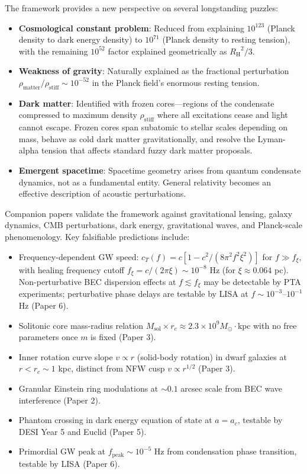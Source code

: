 \documentclass[11pt,a4paper]{article}
\newcommand{\rhostiff}{\ensuremath{\rho_{\mathrm{stiff}}}}
\newcommand{\RH}{\ensuremath{R_{\mathrm{H}}}}
\theoremstyle{definition}
\theoremstyle{remark}
\begin{document}
The framework provides a new perspective on several longstanding puzzles:

\begin{itemize}[leftmargin=*, itemsep=0.2em]
\item \textbf{Cosmological constant problem}: Reduced from explaining $10^{123}$ (Planck density to dark energy density) to $10^{71}$ (Planck density to resting tension), with the remaining $10^{52}$ factor explained geometrically as $\RH^2/3$.

\item \textbf{Weakness of gravity}: Naturally explained as the fractional perturbation $\rho_{\mathrm{matter}}/\rhostiff \sim 10^{-52}$ in the Planck field's enormous resting tension.

\item \textbf{Dark matter}: Identified with frozen cores---regions of the condensate compressed to maximum density $\rhostiff$ where all excitations cease and light cannot escape. Frozen cores span subatomic to stellar scales depending on mass, behave as cold dark matter gravitationally, and resolve the Lyman-alpha tension that affects standard fuzzy dark matter proposals.

\item \textbf{Emergent spacetime}: Spacetime geometry arises from quantum condensate dynamics, not as a fundamental entity. General relativity becomes an effective description of acoustic perturbations.
\end{itemize}

Companion papers validate the framework against gravitational lensing, galaxy dynamics, CMB perturbations, dark energy, gravitational waves, and Planck-scale phenomenology. Key falsifiable predictions include:

\begin{itemize}[leftmargin=*, itemsep=0.2em]
\item Frequency-dependent GW speed: $c_T(f) = c[1 - c^2/(8\pi^2 f^2 \xi^2)]$ for $f \gg f_\xi$, with healing frequency cutoff $f_\xi = c/(2\pi\xi) \sim 10^{-8}$ Hz (for $\xi \approx 0.064$ pc). Non-perturbative BEC dispersion effects at $f \lesssim f_\xi$ may be detectable by PTA experiments; perturbative phase delays are testable by LISA at $f \sim 10^{-3}$--$10^{-1}$ Hz (Paper 6).
\item Solitonic core mass-radius relation $M_{\mathrm{sol}} \times r_c \approx 2.3 \times 10^9 M_\odot \cdot \mathrm{kpc}$ with no free parameters once $m$ is fixed (Paper 3).
\item Inner rotation curve slope $v \propto r$ (solid-body rotation) in dwarf galaxies at $r < r_c \sim 1$ kpc, distinct from NFW cusp $v \propto r^{1/2}$ (Paper 3).
\item Granular Einstein ring modulations at $\sim 0.1$ arcsec scale from BEC wave interference (Paper 2).
\item Phantom crossing in dark energy equation of state at $a = a_c$, testable by DESI Year 5 and Euclid (Paper 5).
\item Primordial GW peak at $f_{\mathrm{peak}} \sim 10^{-5}$ Hz from condensation phase transition, testable by LISA (Paper 6).
\end{itemize}
\end{document}
